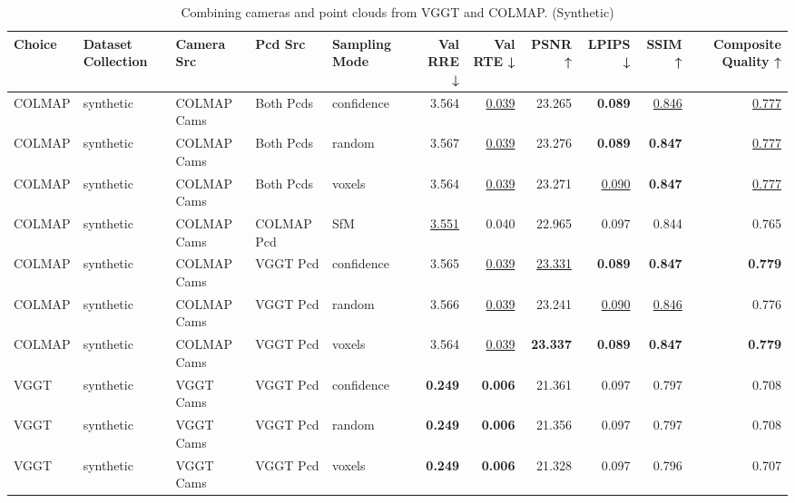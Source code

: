 \begin{table}[H]
\caption{\ifdefined\customcaption \customcaption \else Combining cameras and point clouds from VGGT and COLMAP. (Synthetic) \fi}
\label{tab:07_combined_single_synthetic}
\centering
\tiny
\begin{tabular}{lllllrrrrrr}
\toprule
Choice & Dataset Collection & Camera Src & Pcd Src & Sampling Mode & Val RRE ↓ & Val RTE ↓ & PSNR ↑ & LPIPS ↓ & SSIM ↑ & Composite Quality ↑ \\
\midrule
COLMAP & synthetic & COLMAP Cams & Both Pcds & confidence & 3.564 & \underline{0.039} & 23.265 & \textbf{0.089} & \underline{0.846} & \underline{0.777} \\
COLMAP & synthetic & COLMAP Cams & Both Pcds & random & 3.567 & \underline{0.039} & 23.276 & \textbf{0.089} & \textbf{0.847} & \underline{0.777} \\
COLMAP & synthetic & COLMAP Cams & Both Pcds & voxels & 3.564 & \underline{0.039} & 23.271 & \underline{0.090} & \textbf{0.847} & \underline{0.777} \\
COLMAP & synthetic & COLMAP Cams & COLMAP Pcd & SfM & \underline{3.551} & 0.040 & 22.965 & 0.097 & 0.844 & 0.765 \\
COLMAP & synthetic & COLMAP Cams & VGGT Pcd & confidence & 3.565 & \underline{0.039} & \underline{23.331} & \textbf{0.089} & \textbf{0.847} & \textbf{0.779} \\
COLMAP & synthetic & COLMAP Cams & VGGT Pcd & random & 3.566 & \underline{0.039} & 23.241 & \underline{0.090} & \underline{0.846} & 0.776 \\
COLMAP & synthetic & COLMAP Cams & VGGT Pcd & voxels & 3.564 & \underline{0.039} & \textbf{23.337} & \textbf{0.089} & \textbf{0.847} & \textbf{0.779} \\
VGGT & synthetic & VGGT Cams & VGGT Pcd & confidence & \textbf{0.249} & \textbf{0.006} & 21.361 & 0.097 & 0.797 & 0.708 \\
VGGT & synthetic & VGGT Cams & VGGT Pcd & random & \textbf{0.249} & \textbf{0.006} & 21.356 & 0.097 & 0.797 & 0.708 \\
VGGT & synthetic & VGGT Cams & VGGT Pcd & voxels & \textbf{0.249} & \textbf{0.006} & 21.328 & 0.097 & 0.796 & 0.707 \\
\bottomrule
\end{tabular}
\end{table}